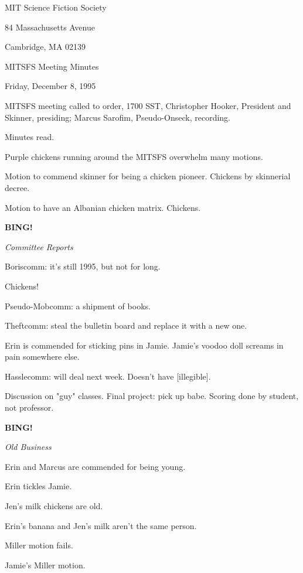 \documentclass[12pt]{article}
\newcommand{\bing}{{\bf BING!} }
\newcommand{\goto}[1]{\bing \vskip 12pt \centerline{{\em{#1}}}}
\begin{document}
\begin{center}

MIT Science Fiction Society 

84 Massachusetts Avenue

Cambridge, MA 02139

\vspace{12pt}

MITSFS Meeting Minutes 

Friday, December 8, 1995

\end{center}
 
\vspace{18pt}

\setlength{\parskip}{6pt}

\noindent
MITSFS meeting called to order, 1700 SST,
Christopher Hooker, President and Skinner, presiding; Marcus Sarofim, Pseudo-Onseck, recording.

Minutes read.

Purple chickens running around the MITSFS overwhelm many motions.

Motion to commend skinner for being a chicken pioneer. Chickens by skinnerial decree.

Motion to have an Albanian chicken matrix. Chickens.

\goto{Committee Reports}

Boriscomm: it's still 1995, but not for long.

Chickens!

Pseudo-Mobcomm: a shipment of books.

Theftcomm: steal the bulletin board and replace it with a new one.

Erin is commended for sticking pins in Jamie. Jamie's voodoo doll screams in pain somewhere else.

Hasslecomm: will deal next week. Doesn't have [illegible].

Discussion on "guy" classes. Final project: pick up babe. Scoring done by student, not professor.

\goto{Old Business}

Erin and Marcus are commended for being young.

Erin tickles Jamie.

Jen's milk chickens are old.

Erin's banana and Jen's milk aren't the same person.

Miller motion fails.

Jamie's Miller motion.
\end{document}
